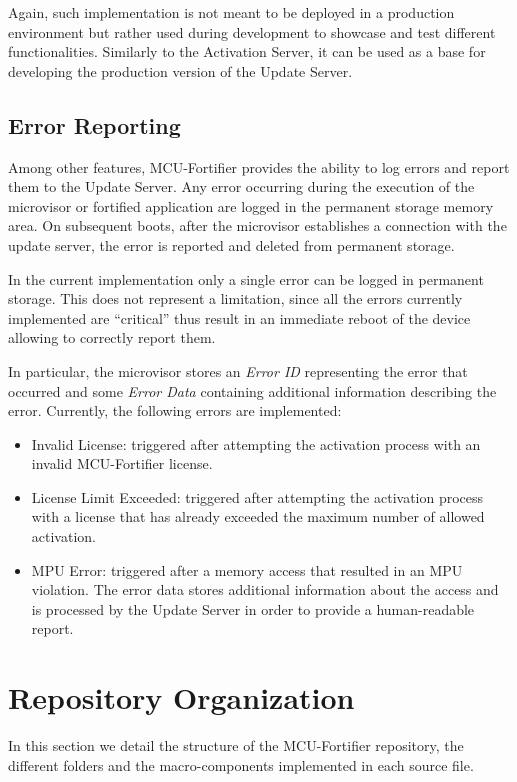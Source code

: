 \documentclass{article}
\begin{document}
Again, such implementation is not meant to be deployed in a production environment but rather used during development to showcase and test different functionalities. Similarly to the Activation Server, it can be used as a base for developing the production version of the Update Server.

\subsection{Error Reporting}
Among other features, MCU-Fortifier provides the ability to log errors and report them to the Update Server. Any error occurring during the execution of the microvisor or fortified application are logged in the permanent storage memory area. On subsequent boots, after the microvisor establishes a connection with the update server, the error is reported and deleted from permanent storage.

In the current implementation only a single error can be logged in permanent storage. This does not represent a limitation, since all the errors currently implemented are ``critical'' thus result in an immediate reboot of the device allowing to correctly report them.

In particular, the microvisor stores an \textit{Error ID} representing the error that occurred and some \textit{Error Data} containing additional information describing the error. Currently, the following errors are implemented:
\begin{itemize}
	\item Invalid License: triggered after attempting the activation process with an invalid MCU-Fortifier license.
	\item License Limit Exceeded: triggered after attempting the activation process with a license that has already exceeded the maximum number of allowed activation.
	\item MPU Error: triggered after a memory access that resulted in an MPU violation. The error data stores additional information about the access and is processed by the Update Server in order to provide a human-readable report.
\end{itemize}


\newpage
\section{Repository Organization}
\label{sec:repo}
In this section we detail the structure of the MCU-Fortifier repository, the different folders and the macro-components implemented in each source file.
\end{document}
